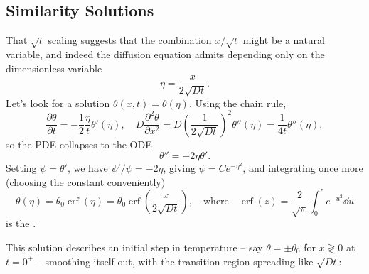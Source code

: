 \documentclass[a4paper]{scrartcl}
\newcommand{\erf}{\operatorname{erf}}
\begin{document}
\subsection{Similarity Solutions}

That $\sqrt{t}$ scaling suggests that the combination $x/\sqrt{t}$ might be a natural variable, and indeed the diffusion equation admits  depending only on the dimensionless variable
$$
\eta = \frac{x}{2 \sqrt{D t}}.
$$
Let's look for a solution $\theta(x, t) = \theta(\eta)$. Using the chain rule,
$$
\frac{\partial \theta}{\partial t} = -\frac{1}{2}\frac{\eta}{t} \theta'(\eta), \quad
D \frac{\partial^2 \theta}{\partial x^2} = D \left(\frac{1}{2\sqrt{Dt}}\right)^2 \theta''(\eta) = \frac{1}{4t}\theta''(\eta),
$$
so the PDE collapses to the ODE
$$
\theta'' = -2 \eta \theta'.
$$
Setting $\psi = \theta'$, we have $\psi'/\psi = -2\eta$, giving $\psi = C e^{-\eta^2}$, and integrating once more (choosing the constant conveniently)
$$
\theta(\eta) = \theta_0 \erf(\eta) = \theta_0 \erf\left(\frac{x}{2 \sqrt{Dt}}\right), \quad \text{where} \quad \erf(z) = \frac{2}{\sqrt{\pi}} \int_0^z e^{-u^2} \dd u
$$
is the .

This solution describes an initial step in temperature -- say $\theta = \pm \theta_0$ for $x \gtrless 0$ at $t = 0^+$ -- smoothing itself out, with the transition region spreading like $\sqrt{Dt}$:
\end{document}
